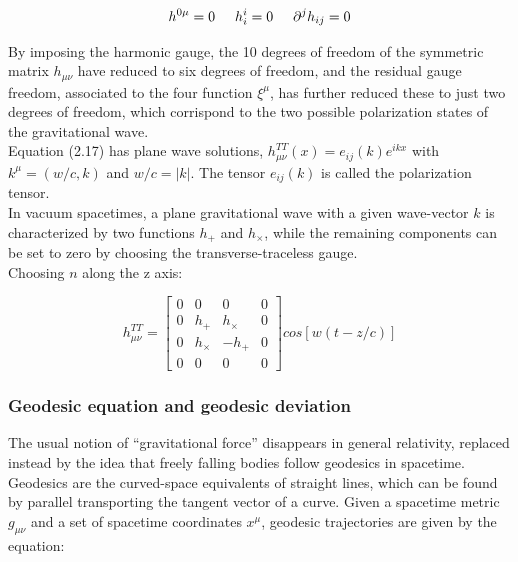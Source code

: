 \documentclass[binding=0.6cm, LaM]{sapthesis}
\begin{document}
		\begin{equation}
		h^{0\mu} = 0 \hspace*{0.5cm}  h^{i}_i = 0  \hspace*{0.5cm}   {\partial}^jh_{ij} = 0
		\end{equation}

	By imposing the harmonic gauge, the 10 degrees of freedom of the symmetric matrix $h_{\mu\nu}$ 
	have reduced to six degrees of freedom, and the residual gauge freedom,
	associated to the four function $\xi^{\mu}$, has further reduced these to just two degrees of freedom, 
	which corrispond to the two possible polarization states of the gravitational wave. \\
	Equation (2.17) has plane wave solutions, $h_{\mu\nu}^{TT}(x)=e_{ij}(k)e^{ikx}$ with 
	$k^{\mu}=(w/c,k)$ and $w/c=|k|$. The tensor $e_{ij}(k)$ is called the polarization tensor. \\

	In vacuum spacetimes, a plane gravitational wave with a given wave-vector $k$ is characterized 
	by two functions $h_+$ and $h_{\times}$, while the remaining components can be set to zero by
	choosing the transverse-traceless gauge. \\
	Choosing $n$ along the z axis:

		\begin{equation} 
		h_{\mu\nu}^{TT} = 
		\begin{bmatrix}
		0 & 0 & 0 & 0 \\
		0 & h_{+} & h_{\times} & 0 \\
		0 & h_{\times} & -h_{+} & 0 \\
		0 & 0 & 0 & 0 
		\end{bmatrix}cos[w(t-z/c)]
		\end{equation}

\subsubsection{Geodesic equation and geodesic deviation}

	The usual notion of “gravitational force” disappears in general relativity, replaced instead 
	by the idea that freely falling bodies follow geodesics in spacetime.
	Geodesics are the curved-space equivalents of straight lines, which can be found by 
	parallel transporting the tangent vector of a curve.
	Given a spacetime metric $g_{\mu\nu}$ and a set of spacetime coordinates $x^{\mu}$, 
	geodesic trajectories are given by the equation:
\end{document}
